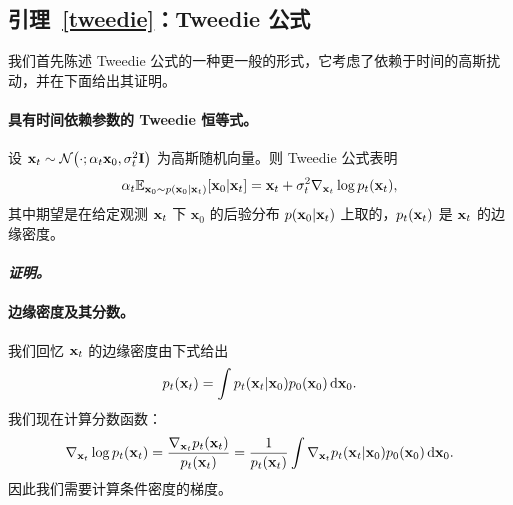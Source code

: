\subsection{引理~\ref{tweedie}：Tweedie 公式}\label{app-sec:tweedie}
我们首先陈述 Tweedie 公式的一种更一般的形式，它考虑了依赖于时间的高斯扰动，并在下面给出其证明。


\paragraph{具有时间依赖参数的 Tweedie 恒等式。}
设 ${\mathbf{x}}_t \sim \mathcal{N}\big(\cdot; \alpha_t{\mathbf{x}}_0, \sigma_t^2{\mathbf{I}}\big)$ 为高斯随机向量。则 Tweedie 公式表明
\begin{align*}
\alpha_t \mathbb{E}_{\mathbf{x}_0 \sim p(\mathbf{x}_0|{\mathbf{x}}_t)}[\mathbf{x}_0|{\mathbf{x}}_t] = {\mathbf{x}}_t + \sigma_t^2 \nabla_{{\mathbf{x}}_t} \log p_t({\mathbf{x}}_t),
\end{align*}
其中期望是在给定观测 ${\mathbf{x}}_t$ 下 $\mathbf{x}_0$ 的后验分布 $p(\mathbf{x}_0|{\mathbf{x}}_t)$ 上取的，$p_t({\mathbf{x}}_t)$ 是 ${\mathbf{x}}_t$ 的边缘密度。


\paragraph{\textit{证明。}}


\paragraph{边缘密度及其分数。}
我们回忆 ${\mathbf{x}}_t$ 的边缘密度由下式给出
\begin{align*}
p_t({\mathbf{x}}_t) = \int p_t({\mathbf{x}}_t|{\mathbf{x}}_0)  p_0({\mathbf{x}}_0)  \mathop{}\!\mathrm{d}{\mathbf{x}}_0.
\end{align*}
我们现在计算分数函数：
\begin{align*}
\nabla_{{\mathbf{x}}_t} \log p_t({\mathbf{x}}_t) 
= \frac{\nabla_{{\mathbf{x}}_t} p_t({\mathbf{x}}_t)}{p_t({\mathbf{x}}_t)} = \frac{1}{p_t({\mathbf{x}}_t)} \int \nabla_{{\mathbf{x}}_t} p_t({\mathbf{x}}_t|{\mathbf{x}}_0)  p_0({\mathbf{x}}_0)  \mathop{}\!\mathrm{d}{\mathbf{x}}_0.
\end{align*}
因此我们需要计算条件密度的梯度。

